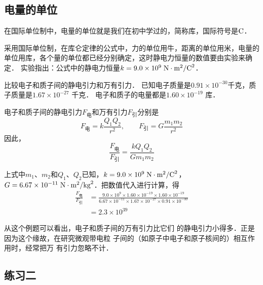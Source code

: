 \subsection{电量的单位} 
在国际单位制中，电量的单位就是我们在初中学过的，简称库，国际符号是$\text{C}$．

采用国际单位制，在库仑定律的公式中，力的单位用牛，距离的单位用米，电量的单位用库，各个量的单位都已经分别确定，这时静电力恒量的数值要由实验来确定．
实验指出：公式中的静电力恒量$k=9.0\times 10^9 \;\text{N}\cdot\text{m}^2/\text{C}^2 $．

\begin{example}
比较电子和质子间的静电引力和万有引力．
已知电子质量是$0.91\times 10^{-30}$千克，质子质量是$1.67\times 10^{-27}$
千克．
电子和质子的电量都是$1.60\times10^{-19}$
库．
\end{example}

    
\begin{solution}
电子和质子间的静电引力$F_{\text{电}}$和万有引力$F_{\text{引}}$分别是
\[F_{\text{电}} =k\frac{Q_1Q_2}{r^2} ,\qquad   F_{\text{引}}=G\frac{m_1m_2}{r^2} \]
因此，
\[\frac{F_{\text{电}}}{F_{\text{引}}}=\frac{kQ_1Q_2}{Gm_1m_2} \]

上式中$m_1$、$m_2$和$Q_1$、$Q_2$已知，$k=9.0\times 10^9 \;\text{N}\cdot\text{m}^2/\text{C}^2$，
$G=6.67\times10^{-11} \;\text{N}\cdot\text{m}^2/\text{kg}^2 $．把数值代入进行计算，得
\[\begin{split}
    \frac{F_{\text{电}}}{F_{\text{引}}}&=\frac{9.0\times 10^9\times1.60\times10^{-19}\times1.60\times10^{-19}}{6.67\times10^{-11}\times 1.67\times10^{-27}\times 0.91\times10^{-30}}\\
    &=2.3\times 10^{39}
\end{split}\]
\end{solution}


从这个例题可以看出，电子和质子间的万有引力比它们
的静电引力小得多．正是因为这个缘故，在研究微观带电粒
子间的（如原子中电子和原子核间的）相互作用时，经常把万
有引力忽略不计．



\subsection*{练习二}


